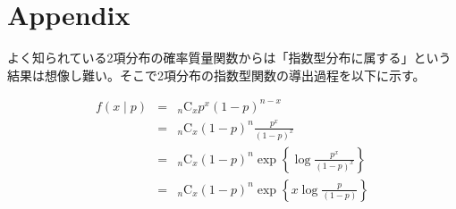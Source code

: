 \documentclass[a4paper,uplatex]{jsarticle}
\begin{document}

\hrulefill
\section*{Appendix}
よく知られている2項分布の確率質量関数からは「指数型分布に属する」という結果は想像し難い。そこで2項分布の指数型関数の導出過程を以下に示す。

\begin{eqnarray*}
  f(x \mid p) &=& {}_n \mathrm{C} _x p^x (1-p)^{n-x} \\
  &=& {}_n \mathrm{C} _x (1-p)^{n} \frac{p^x}{(1-p)^x} \\
  &=& {}_n \mathrm{C} _x (1-p)^{n} \exp\left\{\log{\frac{p^x}{(1-p)^x}}\right\} \\
  &=& {}_n \mathrm{C} _x (1-p)^{n} \exp\left\{
x \log{\frac{p}{(1-p)}}\right\}
\end{eqnarray*}
\end{document}
